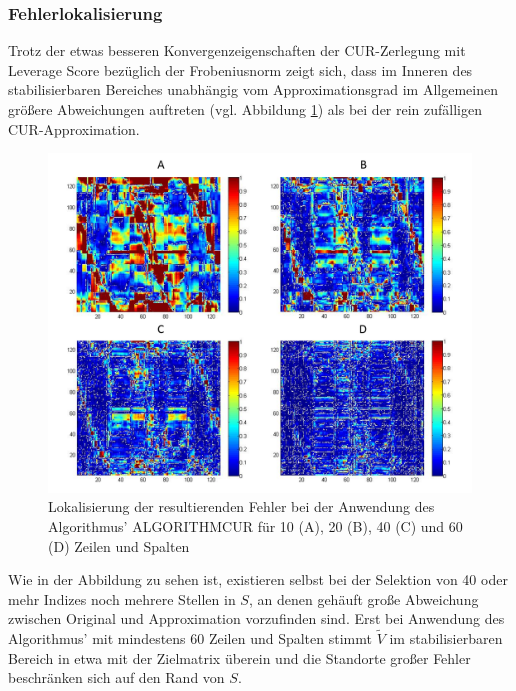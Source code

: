 \documentclass[12pt,a4paper,twoside]{article}
\begin{document}
	\subsubsection*{Fehlerlokalisierung}	
	Trotz der etwas besseren Konvergenzeigenschaften der CUR-Zerlegung mit Leverage Score bezüglich der Frobeniusnorm zeigt sich, dass im Inneren des stabilisierbaren Bereiches unabhängig vom Approximationsgrad im Allgemeinen größere Abweichungen auftreten (vgl. Abbildung \ref{pic:CUR_fehler}) als bei der rein zufälligen CUR-Approximation.
	\begin{figure}[h]
		\center
		\includegraphics[scale=0.5]{CUR_fehler}
		\caption{\label{pic:CUR_fehler}Lokalisierung der resultierenden Fehler bei der Anwendung des Algorithmus' ALGORITHMCUR für 10 (A), 20 (B), 40 (C) und 60 (D) Zeilen und Spalten}
		\end{figure}
		Wie in der Abbildung zu sehen ist, existieren selbst bei der Selektion von 40 oder mehr Indizes noch mehrere 
		Stellen in $S$, an denen gehäuft große Abweichung zwischen Original und Approximation vorzufinden sind. Erst  
		bei Anwendung des Algorithmus' mit mindestens 60 Zeilen und Spalten stimmt $\tilde{V}$ im stabilisierbaren Bereich in etwa mit der Zielmatrix überein und die Standorte großer Fehler beschränken sich auf den Rand von $S$.
\end{document}
